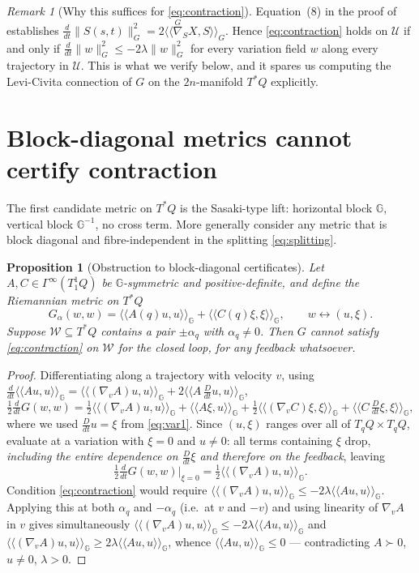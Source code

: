 \documentclass[11pt,a4paper]{article}
\newcommand{\Gm}{\mathbb{G}}                      %
\newcommand{\ip}[2]{\langle\!\langle #1 , #2 \rangle\!\rangle}
\newcommand{\ipG}[2]{\langle\!\langle #1 , #2 \rangle\!\rangle_{\Gm}}
\newcommand{\Gsec}[1]{\Gamma^{\infty}(#1)}
\newcommand{\norm}[1]{\lVert #1 \rVert}
\newcommand{\Tstar}{T^{*}Q}
\newcommand{\Dt}{\tfrac{D}{dt}}
\theoremstyle{plain}
\newtheorem{proposition}[theorem]{Proposition}
\theoremstyle{definition}
\theoremstyle{remark}
\newtheorem{remark}[theorem]{Remark}
\begin{document}
\begin{remark}[Why this suffices for \eqref{eq:contraction}]
\label{rem:equivalence}
Equation~(8) in the proof of \cite[Thm.~2.3]{SB13} establishes
$\tfrac{d}{dt}\norm{S(s,t)}_G^2 = 2\ip{\overset{G}{\nabla}_{S}X}{S}_G$.
Hence \eqref{eq:contraction} holds on $\mathcal{U}$ if and only if
$\tfrac{d}{dt}\norm{w}_G^2 \le -2\lambda\norm{w}_G^2$ for every variation field
$w$ along every trajectory in $\mathcal{U}$. This is what we verify below, and it
spares us computing the Levi-Civita connection of $G$ on the $2n$-manifold
$\Tstar$ explicitly.
\end{remark}

\section{Block-diagonal metrics cannot certify contraction}
\label{sec:sasaki}

The first candidate metric on $\Tstar$ is the Sasaki-type lift: horizontal block
$\Gm$, vertical block $\Gm^{-1}$, no cross term. More generally consider any
metric that is block diagonal and fibre-independent in the splitting
\eqref{eq:splitting}.

\begin{proposition}[Obstruction to block-diagonal certificates]
\label{prop:sasaki}
Let $A,C \in \Gsec{T^1_1Q}$ be $\Gm$-symmetric and positive-definite, and define
the Riemannian metric on $\Tstar$
\[
  G_\alpha(w,w) = \ipG{A(q)u}{u} + \ipG{C(q)\xi}{\xi},
  \qquad w \leftrightarrow (u,\xi).
\]
Suppose $\mathcal{W}\subseteq\Tstar$ contains a pair $\pm\alpha_q$ with
$\alpha_q \ne 0$. Then $G$ cannot satisfy \eqref{eq:contraction} on $\mathcal{W}$
for the closed loop, \emph{for any feedback whatsoever}.
\end{proposition}

\begin{proof}
Differentiating along a trajectory with velocity $v$, using
$\tfrac{d}{dt}\ipG{Au}{u} = \ipG{(\nabla_vA)u}{u} + 2\ipG{A\,\Dt u}{u}$,
\[
  \tfrac12\tfrac{d}{dt}G(w,w)
  = \tfrac12\ipG{(\nabla_vA)u}{u} + \ipG{A\xi}{u}
    + \tfrac12\ipG{(\nabla_vC)\xi}{\xi} + \ipG{C\,\Dt\xi}{\xi},
\]
where we used $\Dt u = \xi$ from \eqref{eq:var1}. Since $(u,\xi)$ ranges over all
of $T_qQ\times T_qQ$, evaluate at a variation with $\xi = 0$ and $u \ne 0$: all
terms containing $\xi$ drop, \emph{including the entire dependence on
$\Dt\xi$ and therefore on the feedback}, leaving
\[
  \tfrac12\tfrac{d}{dt}G(w,w)\Big|_{\xi=0} = \tfrac12\ipG{(\nabla_vA)u}{u}.
\]
Condition \eqref{eq:contraction} would require
$\ipG{(\nabla_vA)u}{u} \le -2\lambda\ipG{Au}{u}$. Applying this at both
$\alpha_q$ and $-\alpha_q$ (i.e.\ at $v$ and $-v$) and using linearity of
$\nabla_vA$ in $v$ gives simultaneously
$\ipG{(\nabla_vA)u}{u} \le -2\lambda\ipG{Au}{u}$ and
$\ipG{(\nabla_vA)u}{u} \ge 2\lambda\ipG{Au}{u}$, whence
$\ipG{Au}{u}\le 0$ --- contradicting $A \succ 0$, $u\ne0$, $\lambda>0$.
\end{proof}
\end{document}
